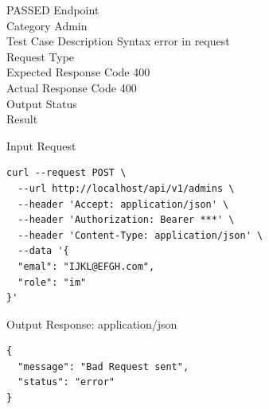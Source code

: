 \begin{testcase}{26}{PASSED}
Endpoint \hfill {}\\
Category \hfill Admin\\
Test Case Description \hfill Syntax error in request\\

Request Type    \hfill {}\\
Expected Response Code    \hfill 400\\
Actual Response Code    \hfill 400\\

Output Status \hfill {}\\
Result \hfill {}

\begin{ipblock}{Input Request}
\begin{verbatim}
curl --request POST \
  --url http://localhost/api/v1/admins \
  --header 'Accept: application/json' \
  --header 'Authorization: Bearer ***' \
  --header 'Content-Type: application/json' \
  --data '{
  "emal": "IJKL@EFGH.com",
  "role": "im"
}'
\end{verbatim}
\end{ipblock}

\begin{opblock}{Output Response: application/json}
\begin{verbatim}
{
  "message": "Bad Request sent",
  "status": "error"
}
\end{verbatim}
\end{opblock}
\end{testcase}

